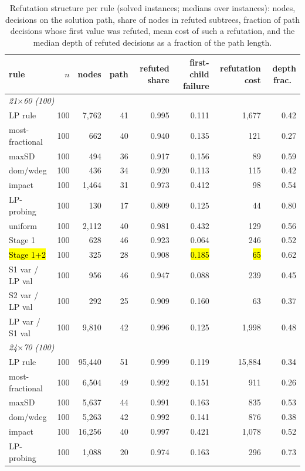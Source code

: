\begin{table}[t]
\centering
\caption{Refutation structure per rule (solved instances; medians over instances): nodes, decisions on the solution path, share of nodes in refuted subtrees, fraction of path decisions whose first value was refuted, mean cost of such a refutation, and the median depth of refuted decisions as a fraction of the path length.}
\label{tab:trace}
\small
\begin{tabular}{lrrrrrrr}
\toprule
rule & $n$ & nodes & path & refuted share & first-child failure & refutation cost & depth frac.\ \\
\midrule
\multicolumn{8}{l}{\emph{21$\times$60 (100)}} \\
LP rule & 100 & 7,762 & 41 & 0.995 & 0.111 & 1,677 & 0.42 \\
most-fractional & 100 & 662 & 40 & 0.940 & 0.135 & 121 & 0.27 \\
maxSD & 100 & 494 & 36 & 0.917 & 0.156 & 89 & 0.59 \\
dom/wdeg & 100 & 436 & 34 & 0.920 & 0.113 & 115 & 0.42 \\
impact & 100 & 1,464 & 31 & 0.973 & 0.412 & 98 & 0.54 \\
LP-probing & 100 & 130 & 17 & 0.809 & 0.125 & 44 & 0.80 \\
uniform & 100 & 2,112 & 40 & 0.981 & 0.432 & 129 & 0.56 \\
Stage 1 & 100 & 628 & 46 & 0.923 & 0.064 & 246 & 0.52 \\
\hl{Stage 1+2} & 100 & 325 & 28 & 0.908 & \hl{0.185} & \hl{65} & 0.62 \\
S1 var / LP val & 100 & 956 & 46 & 0.947 & 0.088 & 239 & 0.45 \\
S2 var / LP val & 100 & 292 & 25 & 0.909 & 0.160 & 63 & 0.37 \\
LP var / S1 val & 100 & 9,810 & 42 & 0.996 & 0.125 & 1,998 & 0.48 \\
\midrule
\multicolumn{8}{l}{\emph{24$\times$70 (100)}} \\
LP rule & 100 & 95,440 & 51 & 0.999 & 0.119 & 15,884 & 0.34 \\
most-fractional & 100 & 6,504 & 49 & 0.992 & 0.151 & 911 & 0.26 \\
maxSD & 100 & 5,637 & 44 & 0.991 & 0.163 & 835 & 0.53 \\
dom/wdeg & 100 & 5,263 & 42 & 0.992 & 0.141 & 876 & 0.38 \\
impact & 100 & 16,256 & 40 & 0.997 & 0.421 & 1,078 & 0.52 \\
LP-probing & 100 & 1,088 & 20 & 0.974 & 0.163 & 296 & 0.73 \\

\end{tabular}
\end{table}
